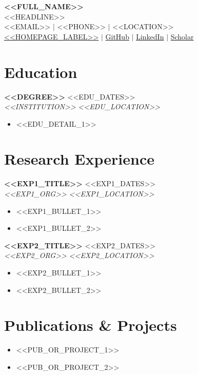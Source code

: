 \documentclass[10pt,a4paper]{article}
\newcommand{\entry}[4]{%
  \textbf{#1} \hfill \textcolor{muted}{#3}\\[1pt]
  \textit{#2} \hfill \textcolor{muted}{\textit{#4}}\\[2pt]
}
\begin{document}
\begin{center}
  {\huge\bfseries <<FULL_NAME>>}\\[4pt]
  \textcolor{muted}{<<HEADLINE>>}\\[4pt]
  <<EMAIL>> \;$\vert$\; <<PHONE>> \;$\vert$\; <<LOCATION>>\\[2pt]
  \href{<<HOMEPAGE_URL>>}{<<HOMEPAGE_LABEL>>} \;$\vert$\;
  \href{<<GITHUB_URL>>}{GitHub} \;$\vert$\;
  \href{<<LINKEDIN_URL>>}{LinkedIn} \;$\vert$\;
  \href{<<SCHOLAR_URL>>}{Scholar}
\end{center}

\section{Education}
\entry{<<DEGREE>>}{<<INSTITUTION>>}{<<EDU_DATES>>}{<<EDU_LOCATION>>}
\begin{itemize}
  \item <<EDU_DETAIL_1>>  %
\end{itemize}

\section{Research Experience}
\entry{<<EXP1_TITLE>>}{<<EXP1_ORG>>}{<<EXP1_DATES>>}{<<EXP1_LOCATION>>}
\begin{itemize}
  \item <<EXP1_BULLET_1>>
  \item <<EXP1_BULLET_2>>
\end{itemize}

\entry{<<EXP2_TITLE>>}{<<EXP2_ORG>>}{<<EXP2_DATES>>}{<<EXP2_LOCATION>>}
\begin{itemize}
  \item <<EXP2_BULLET_1>>
  \item <<EXP2_BULLET_2>>
\end{itemize}

\section{Publications \& Projects}
\begin{itemize}
  \item <<PUB_OR_PROJECT_1>>
  \item <<PUB_OR_PROJECT_2>>
\end{itemize}
\end{document}
